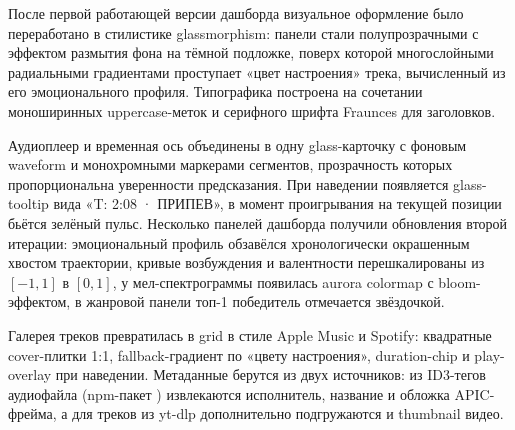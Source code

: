 После первой работающей версии дашборда визуальное оформление было переработано в стилистике glassmorphism: панели стали полупрозрачными с эффектом размытия фона на тёмной подложке, поверх которой многослойными радиальными градиентами проступает «цвет настроения» трека, вычисленный из его эмоционального профиля. Типографика построена на сочетании моноширинных uppercase-меток и серифного шрифта Fraunces для заголовков.

Аудиоплеер и временная ось объединены в одну glass-карточку с фоновым waveform и монохромными маркерами сегментов, прозрачность которых пропорциональна уверенности предсказания. При наведении появляется glass-tooltip вида «T: 2:08 · ПРИПЕВ», в момент проигрывания на текущей позиции бьётся зелёный пульс. Несколько панелей дашборда получили обновления второй итерации: эмоциональный профиль обзавёлся хронологически окрашенным хвостом траектории, кривые возбуждения и валентности перешкалированы из $[-1, 1]$ в $[0, 1]$, у мел-спектрограммы появилась aurora colormap с bloom-эффектом, в жанровой панели топ-1 победитель отмечается звёздочкой.

Галерея треков превратилась в grid в стиле Apple Music и Spotify: квадратные cover-плитки 1:1, fallback-градиент по «цвету настроения», duration-chip и play-overlay при наведении. Метаданные берутся из двух источников: из ID3-тегов аудиофайла (npm-пакет ) извлекаются исполнитель, название и обложка APIC-фрейма, а для треков из yt-dlp дополнительно подгружаются  и thumbnail видео.
